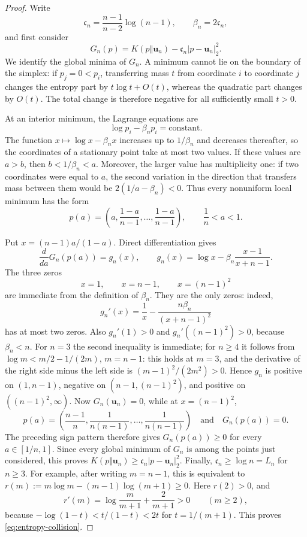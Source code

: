 \begin{proof}
Write
\[
  \mathfrak c_n=\frac{n-1}{n-2}\log(n-1),
  \qquad \beta_n=2\mathfrak c_n,
\]
and first consider
\[
  G_n(p)=K(p\Vert \mathbf u_n)-\mathfrak c_n|p-\mathbf u_n|_2^2.
\]
We identify the global minima of \(G_n\). A minimum cannot lie on the
boundary of the simplex: if \(p_j=0<p_i\), transferring mass \(t\) from
coordinate \(i\) to coordinate \(j\) changes the entropy part by
\(t\log t+O(t)\), whereas the quadratic part changes by \(O(t)\). The
total change is therefore negative for all sufficiently small \(t>0\).

At an interior minimum, the Lagrange equations are
\begin{equation}
\label{eq:potts-stationarity}
  \log p_i-\beta_np_i=\text{constant}.
\end{equation}
The function \(x\mapsto\log x-\beta_nx\) increases up to
\(1/\beta_n\) and decreases thereafter, so the coordinates of a stationary
point take at most two values. If these values are \(a>b\), then
\(b<1/\beta_n<a\). Moreover, the larger value has multiplicity one:
if two coordinates were equal to \(a\), the second variation in the
direction that transfers mass between them would be
\(2(1/a-\beta_n)<0\). Thus every nonuniform local minimum has the form
\[
  p(a)=\left(a,\frac{1-a}{n-1},\ldots,
                  \frac{1-a}{n-1}\right),
  \qquad \frac1n<a<1.
\]

Put \(x=(n-1)a/(1-a)\). Direct differentiation gives
\[
  \frac{d}{da}G_n(p(a))
  =g_n(x),
  \qquad
  g_n(x)=\log x-\beta_n\frac{x-1}{x+n-1}.
\]
The three zeros
\[
  x=1,\qquad x=n-1,\qquad x=(n-1)^2
\]
are immediate from the definition of \(\beta_n\). They are the only
zeros: indeed,
\[
  g_n'(x)=\frac1x-\frac{n\beta_n}{(x+n-1)^2}
\]
has at most two zeros. Also \(g_n'(1)>0\) and
\(g_n'((n-1)^2)>0\), because \(\beta_n<n\). For \(n=3\) the second
inequality is immediate; for \(n\ge4\) it follows from
\(\log m<m/2-1/(2m)\), \(m=n-1\): this holds at \(m=3\), and the
derivative of the right side minus the left side is
\((m-1)^2/(2m^2)>0\). Hence \(g_n\) is positive on \((1,n-1)\), negative on
\((n-1,(n-1)^2)\), and positive on \(((n-1)^2,\infty)\).
Now \(G_n(\mathbf u_n)=0\), while at \(x=(n-1)^2\),
\[
  p(a)=\left(\frac{n-1}{n},
      \frac1{n(n-1)},\ldots,\frac1{n(n-1)}\right)
  \quad\text{and}\quad G_n(p(a))=0.
\]
The preceding sign pattern therefore gives \(G_n(p(a))\ge0\) for every
\(a\in[1/n,1]\). Since every global minimum of \(G_n\) is among the
points just considered, this proves
\(K(p\Vert\mathbf u_n)\ge \mathfrak c_n|p-\mathbf u_n|_2^2\). Finally,
\(\mathfrak c_n\ge\log n=L_n\) for \(n\ge3\). For example, after writing
\(m=n-1\), this is equivalent to
\(r(m):=m\log m-(m-1)\log(m+1)\ge0\). Here \(r(2)>0\), and
\[
  r'(m)=\log\frac{m}{m+1}+\frac2{m+1}>0
  \qquad(m\ge2),
\]
because \(-\log(1-t)<t/(1-t)<2t\) for
\(t=1/(m+1)\). This proves \eqref{eq:entropy-collision}.


\end{proof}
